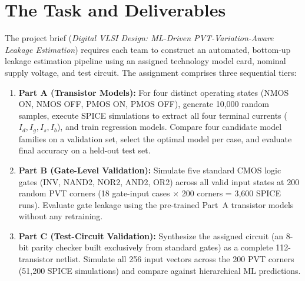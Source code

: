 \documentclass[11pt,a4paper]{article}
\numberwithin{table}{section}
\numberwithin{figure}{section}
\begin{document}
\section{The Task and Deliverables}
The project brief (\textit{Digital VLSI Design: ML-Driven PVT-Variation-Aware Leakage Estimation}) requires each team to construct an automated, bottom-up leakage estimation pipeline using an assigned technology model card, nominal supply voltage, and test circuit. The assignment comprises three sequential tiers:
\begin{enumerate}[noitemsep]
    \item \textbf{Part A (Transistor Models):} For four distinct operating states (NMOS ON, NMOS OFF, PMOS ON, PMOS OFF), generate 10,000 random samples, execute SPICE simulations to extract all four terminal currents ($I_d, I_g, I_s, I_b$), and train regression models. Compare four candidate model families on a validation set, select the optimal model per case, and evaluate final accuracy on a held-out test set.
    \item \textbf{Part B (Gate-Level Validation):} Simulate five standard CMOS logic gates (INV, NAND2, NOR2, AND2, OR2) across all valid input states at 200 random PVT corners (18 gate-input cases $\times$ 200 corners = 3,600 SPICE runs). Evaluate gate leakage using the pre-trained Part~A transistor models without any retraining.
    \item \textbf{Part C (Test-Circuit Validation):} Synthesize the assigned circuit (an 8-bit parity checker built exclusively from standard gates) as a complete 112-transistor netlist. Simulate all 256 input vectors across the 200 PVT corners (51,200 SPICE simulations) and compare against hierarchical ML predictions.
\end{enumerate}
\end{document}
